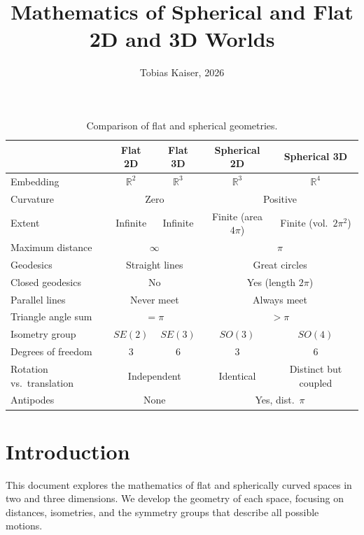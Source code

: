 \documentclass[twocolumn,10pt]{article}
\title{Mathematics of Spherical and Flat 2D and 3D Worlds}
\author{Tobias Kaiser, 2026}
\date{}
\begin{document}
\maketitle

\begin{table}[!b]
\centering
\renewcommand{\arraystretch}{1.2}
\begin{tabular}{|l|c|c|c|c|}
\hline
    & \textbf{Flat 2D} & \textbf{Flat 3D} & \textbf{Spherical 2D} & \textbf{Spherical 3D} \\
\hline
Embedding & $\mathbb{R}^2$ & $\mathbb{R}^3$ & $\mathbb{R}^3$ & $\mathbb{R}^4$ \\
\hline
Curvature & \multicolumn{2}{c|}{Zero} & \multicolumn{2}{c|}{Positive} \\
\hline
Extent & Infinite & Infinite & Finite (area $4\pi$) & Finite (vol.\ $2\pi^2$) \\
\hline
Maximum distance & \multicolumn{2}{c|}{$\infty$} & \multicolumn{2}{c|}{$\pi$} \\
\hline
Geodesics & \multicolumn{2}{c|}{Straight lines} & \multicolumn{2}{c|}{Great circles} \\
\hline
Closed geodesics & \multicolumn{2}{c|}{No} & \multicolumn{2}{c|}{Yes (length $2\pi$)} \\
\hline
Parallel lines & \multicolumn{2}{c|}{Never meet} & \multicolumn{2}{c|}{Always meet} \\
\hline
Triangle angle sum & \multicolumn{2}{c|}{$= \pi$} & \multicolumn{2}{c|}{$> \pi$} \\
\hline
Isometry group & $SE(2)$ & $SE(3)$ & $SO(3)$ & $SO(4)$ \\
\hline
Degrees of freedom & 3 & 6 & 3 & 6 \\
\hline
Rotation vs.\ translation & \multicolumn{2}{c|}{Independent} & Identical & Distinct but coupled \\
\hline
Antipodes & \multicolumn{2}{c|}{None} & \multicolumn{2}{c|}{Yes, dist.\ $\pi$} \\
\hline
\end{tabular}
\caption{Comparison of flat and spherical geometries.}
\label{tab:comparison}
\end{table}

\tableofcontents

\newpage

\section{Introduction}

This document explores the mathematics of flat and spherically curved spaces in two and three dimensions. We develop the geometry of each space, focusing on distances, isometries, and the symmetry groups that describe all possible motions.
\end{document}
